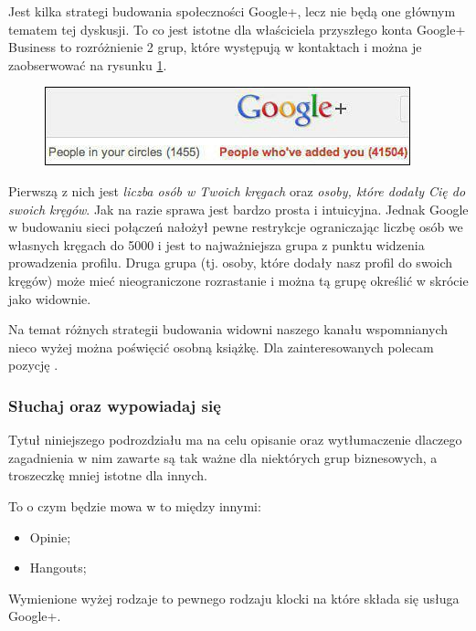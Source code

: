 Jest kilka strategi budowania społeczności Google+, lecz nie będą one głównym tematem tej dyskusji. To co jest istotne dla właściciela przyszłego konta Google+ Business to rozróżnienie 2 grup, które występują w kontaktach i można je zaobserwować na rysunku \ref{fig:size-of-audience-in-google-plus-circles}. 

\begin{figure}[!h]
\centering
    \scalebox{0.7}
    {
        \includegraphics{images/size-of-audience-in-google-plus-circles.png}
    }
    \label{fig:size-of-audience-in-google-plus-circles}
\end{figure}

Pierwszą z nich jest \emph{liczba osób w Twoich kręgach} oraz \emph{osoby, które dodały Cię do swoich kręgów}. Jak na razie sprawa jest bardzo prosta i intuicyjna. Jednak Google w budowaniu sieci połączeń nałożył pewne restrykcje ograniczając liczbę osób we własnych kręgach do 5000 i jest to najważniejsza grupa z punktu widzenia prowadzenia profilu. Druga grupa (tj. osoby, które  dodały nasz profil do swoich kręgów) może mieć nieograniczone rozrastanie i można tą grupę określić w skrócie jako widownie. 

Na temat różnych strategii budowania widowni naszego kanału wspomnianych nieco wyżej można poświęcić osobną książkę. Dla zainteresowanych polecam pozycję \cite{Brogan12}.


\subsubsection{Słuchaj oraz wypowiadaj się}
Tytuł niniejszego podrozdziału ma na celu opisanie oraz wytłumaczenie dlaczego zagadnienia w nim zawarte są tak ważne dla niektórych grup biznesowych, a troszeczkę mniej istotne dla innych.

To o czym będzie mowa w to między innymi:

\begin{itemize}
\item Opinie;
\item Hangouts;
\end{itemize}

Wymienione wyżej rodzaje to pewnego rodzaju klocki na które składa się usługa Google+. 

